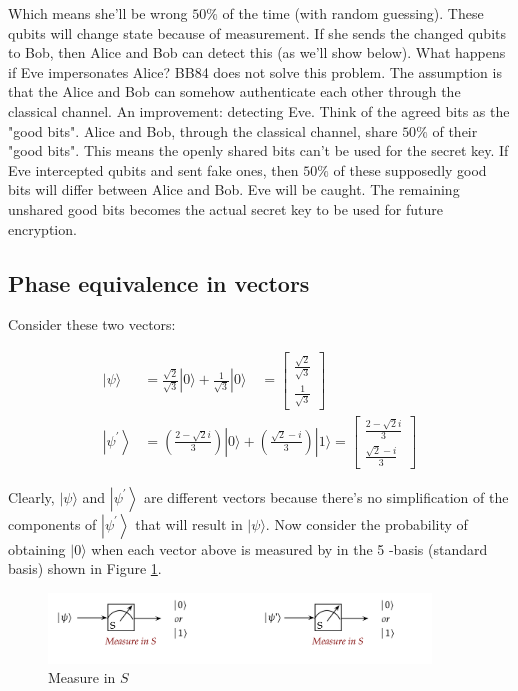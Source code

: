 \documentclass[main.tex]{subfiles}
\begin{document}
    Which means she'll be wrong $50 \%$ of the time (with random guessing). These qubits will change state because of measurement. If she sends the changed qubits to Bob, then Alice and Bob can detect this (as we'll show below). What happens if Eve impersonates Alice? BB84 does not solve this problem. The assumption is that the Alice and Bob can somehow authenticate each other through the classical channel. An improvement: detecting Eve. Think of the agreed bits as the "good bits". Alice and Bob, through the classical channel, share $50 \%$ of their "good bits". This means the openly shared bits can't be used for the secret key. If Eve intercepted qubits and sent fake ones, then $50 \%$ of these supposedly good bits will differ between Alice and Bob. Eve will be caught. The remaining unshared good bits becomes the actual secret key to be used for future encryption.

\subsection{Phase equivalence in vectors}

    Consider these two vectors:
    
    $$
    \begin{aligned}
    |\psi\rangle &=\frac{\sqrt{2}}{\sqrt{3}}|0\rangle+\frac{1}{\sqrt{3}}|0\rangle \quad=\left[\begin{array}{c}
    \frac{\sqrt{2}}{\sqrt{3}} \\
    \frac{1}{\sqrt{3}}
    \end{array}\right] \\
    \left|\psi^{\prime}\right\rangle &=\left(\frac{2-\sqrt{2} i}{3}\right)|0\rangle+\left(\frac{\sqrt{2}-i}{3}\right)|1\rangle=\left[\begin{array}{c}
    \frac{2-\sqrt{2} i}{3} \\
    \frac{\sqrt{2}-i}{3}
    \end{array}\right]
    \end{aligned}
    $$
    
    Clearly, $|\psi\rangle$ and $\left|\psi^{\prime}\right\rangle$ are different vectors because there's no simplification of the components of $\left|\psi^{\prime}\right\rangle$ that will result in $|\psi\rangle$. Now consider the probability of obtaining $|0\rangle$ when each vector above is measured by in the 5 -basis (standard basis) shown in Figure \ref{fig:48phase}.
    
    \begin{figure}
        \centering
        \includegraphics[width=4in]{notes/figs/n05/48phase.png}
        \caption{Measure in $S$}
        \label{fig:48phase}
    \end{figure}  
    
\end{document}
